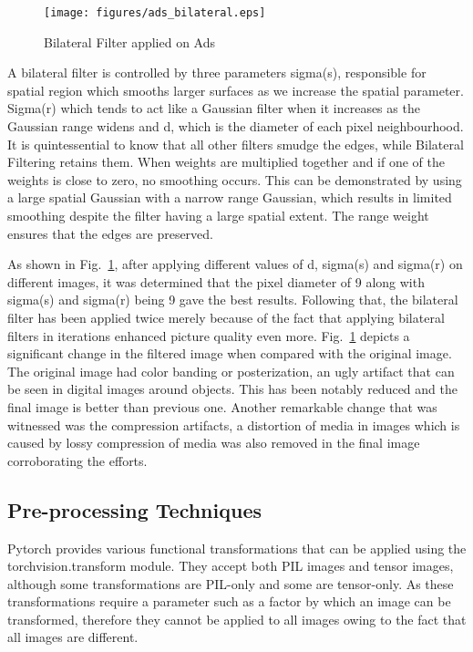 \documentclass[conference]{IEEEtran}
\begin{document}
\begin{figure}[htp]
\texttt{[image: figures/ads\_bilateral.eps]}
\caption{Bilateral Filter applied on Ads }
\label{fig:ads_bilateral}
\end{figure}

A bilateral filter is controlled by three parameters sigma(s), responsible for spatial 
region which smooths larger surfaces as we increase the spatial parameter. Sigma(r) 
which tends to act like a Gaussian filter when it increases as the Gaussian range 
widens and d, which is the diameter of each pixel neighbourhood. It is quintessential 
to know that all other filters smudge the edges, while Bilateral Filtering retains 
them. When weights are multiplied together and if one of the weights is close to
 zero, no smoothing occurs. This can be demonstrated by using a large spatial Gaussian 
 with a narrow range Gaussian, which results in limited smoothing despite the filter 
 having a large spatial extent. The range weight ensures that the edges are preserved.

As shown in Fig.~\ref{fig:ads_bilateral}, after applying different values of d, sigma(s) 
and sigma(r) on different images, it was determined that the pixel diameter of 9 
along with sigma(s) and sigma(r) being 9 gave the best results. Following that, 
the bilateral filter has been applied twice merely because of the fact that applying 
bilateral filters in iterations enhanced picture quality even more. 
Fig.~\ref{fig:ads_bilateral} depicts a significant change in the filtered image 
when compared with the original image. The original image had color banding or posterization,
 an ugly artifact that can be seen in digital images around objects. This has been notably 
 reduced\cite{b16} and the final image is better than previous one. Another remarkable 
 change that was witnessed was the compression artifacts, a distortion of media in images 
 which is caused by lossy compression of media was also removed in the 
 final image corroborating the efforts. 

\subsection{Pre-processing Techniques}
Pytorch provides various functional transformations that can be applied using the 
torchvision.transform module. They accept both PIL images and tensor images, 
although some transformations are PIL-only and some are tensor-only\cite{b17}. 
As these transformations require a parameter such as a factor by which an image 
can be transformed, therefore they cannot be applied to all images owing to the 
fact that all images are different.
\end{document}
